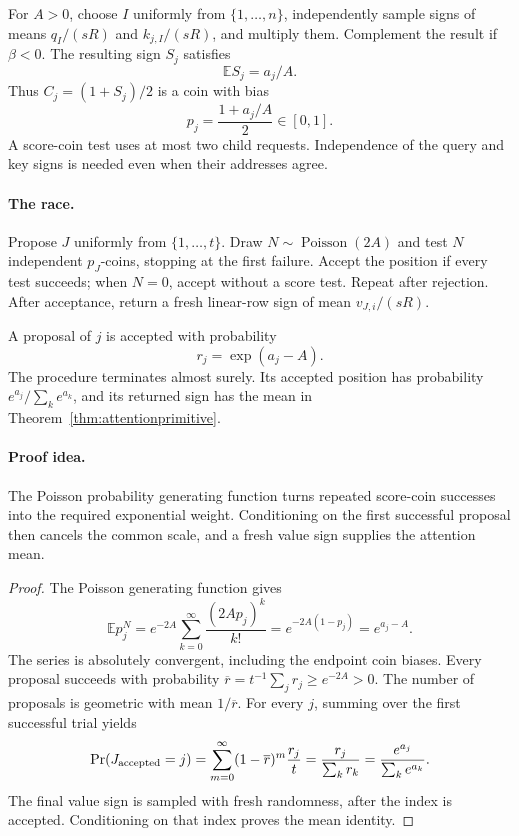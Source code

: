 For $A>0$, choose $I$ uniformly from $\{1,\ldots,n\}$, independently
sample signs of means $q_I/(sR)$ and $k_{j,I}/(sR)$, and multiply them.
Complement the result if $\beta<0$.  The resulting sign $S_j$ satisfies
\[
 \mathbb E S_j=a_j/A.
\]
Thus $C_j=(1+S_j)/2$ is a coin with bias
\begin{equation}\label{eq:attentionscorecoin}
 p_j=\frac{1+a_j/A}{2}\in[0,1].
\end{equation}
A score-coin test uses at most two child requests.  Independence of the
query and key signs is needed even when their addresses agree.

\paragraph{The race.}
Propose $J$ uniformly from $\{1,\ldots,t\}$.  Draw
$N\sim\operatorname{Poisson}(2A)$ and test $N$ independent $p_J$-coins,
stopping at the first failure.  Accept the position if every test succeeds;
when $N=0$, accept without a score test.  Repeat after rejection.  After
acceptance, return a fresh linear-row sign of mean $v_{J,i}/(sR)$.

\begin{lemma}
\label{lem:attentionraceexact}
A proposal of $j$ is accepted with probability
\[
 r_j=\exp(a_j-A).
\]
The procedure terminates almost surely.  Its accepted position has
probability $e^{a_j}/\sum_k e^{a_k}$, and its returned sign has the mean
in Theorem~\ref{thm:attentionprimitive}.
\end{lemma}
\paragraph{Proof idea.}
The Poisson probability generating function turns repeated score-coin successes into the required exponential weight.  Conditioning on the first successful proposal then cancels the common scale, and a fresh value sign supplies the attention mean.

\begin{proof}
The Poisson generating function gives
\[
 \mathbb E p_j^N
 =e^{-2A}\sum_{k=0}^\infty\frac{(2Ap_j)^k}{k!}
 =e^{-2A(1-p_j)}=e^{a_j-A}.
\]
The series is absolutely convergent, including the endpoint coin biases.
Every proposal succeeds with probability
$\overline r=t^{-1}\sum_jr_j\ge e^{-2A}>0$.
The number of proposals is geometric with mean $1/\overline r$.
For every $j$, summing over the first successful trial yields
\[
 \Pr(J_{\rm accepted}=j)
 =\sum_{m=0}^{\infty}(1-\overline r)^m\frac{r_j}{t}
 =\frac{r_j}{\sum_kr_k}
 =\frac{e^{a_j}}{\sum_ke^{a_k}}.
\]
The final value sign is sampled with fresh randomness, after the index is
accepted.  Conditioning on that index proves the mean identity.
\end{proof}

